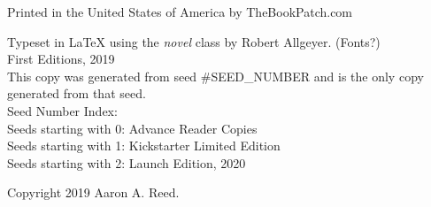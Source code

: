 \thispagestyle{empty}

\NewFontFamily{}
\vspace*{6\nbs}
\begin{center}
{\mont {}}
\end{center}
\clearpage

\thispagestyle{empty}
\null %
\clearpage

\thispagestyle{empty}
\vspace*{6\nbs}
\begin{center}
{\mont {}}

\vspace*{3\nbs}

{\mont {}}

\vfill
Printed in the United States of America by TheBookPatch.com

\end{center}
\clearpage

\thispagestyle{empty}
\null\vfill

\begin{legalese}
Typeset in LaTeX using the \textit{novel} class by Robert Allgeyer. (Fonts?) \\
\vspace{1\nbs}
First Editions, 2019 \\
This copy was generated from seed #SEED_NUMBER and is the only copy generated from that seed. \\

Seed Number Index: \\
Seeds starting with 0: Advance Reader Copies \\
Seeds starting with 1: Kickstarter Limited Edition \\
Seeds starting with 2: Launch Edition, 2020

Copyright 2019 Aaron A. Reed.
\end{legalese}
\clearpage

\thispagestyle{empty}

\vspace*{10\nbs}

